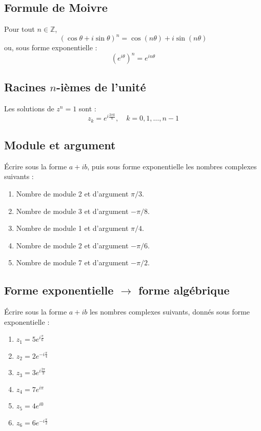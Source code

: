 \subsection*{Formule de Moivre}

Pour tout $n \in \mathbb{Z}$,
\[
\left(\cos\theta + i\sin\theta\right)^n = \cos(n\theta) + i\sin(n\theta)
\]
ou, sous forme exponentielle :
\[
\left(e^{i\theta}\right)^n = e^{in\theta}
\]

\subsection*{Racines $n$-ièmes de l'unité}

Les solutions de $z^n = 1$ sont :
\[
z_k = e^{i\frac{2\pi k}{n}},\quad k = 0, 1, \ldots, n-1
\]



\vspace{3em}

\subsection{Module et argument}

Écrire sous la forme $a+i b$, puis sous forme exponentielle les nombres complexes suivants :
\begin{enumerate}
\item Nombre de module 2 et d'argument $\pi / 3$.
\item Nombre de module 3 et d'argument $-\pi / 8$.
\item Nombre de module 1 et d'argument $\pi / 4$.
\item Nombre de module 2 et d'argument $-\pi / 6$.
\item Nombre de module 7 et d'argument $-\pi / 2$.
\end{enumerate}

\vspace{2em}

\subsection{Forme exponentielle $\rightarrow$ forme algébrique}

Écrire sous la forme $a+ib$ les nombres complexes suivants, donnés sous forme exponentielle :
\begin{multicols}{2}
\begin{enumerate}
    \item $z_1 = 5 e^{i \frac{\pi}{6}}$
    \item $z_2 = 2 e^{-i \frac{\pi}{4}}$
    \item $z_3 = 3 e^{i \frac{2\pi}{3}}$
    \item $z_4 = 7 e^{i \pi}$
    \item $z_5 = 4 e^{i 0}$
    \item $z_6 = 6 e^{-i \frac{\pi}{2}}$
\end{enumerate}
\end{multicols}

